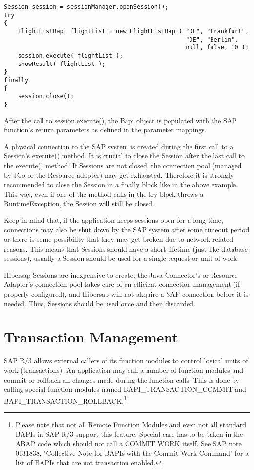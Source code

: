 \begin{lstlisting}[caption=Executing the BAPI function]
Session session = sessionManager.openSession();
try
{
    FlightListBapi flightList = new FlightListBapi( "DE", "Frankfurt", 
                                                    "DE", "Berlin", 
                                                    null, false, 10 );
    session.execute( flightList );
    showResult( flightList );
}
finally
{
    session.close();
}
\end{lstlisting}

After the call to session.execute(), the Bapi object is populated with the SAP function's return parameters as 
defined in the parameter mappings.

A physical connection to the SAP system is created during the first call to a Session's execute() method. 
It is crucial to close the Session after the last call to the execute() method. If Sessions are not
closed, the connection pool (managed by JCo or the Resource adapter) may get exhausted. 
Therefore it is strongly recommended to close the Session in a
finally block like in the above example. This way, even if one of the method calls in the try block throws
a RuntimeException, the Session will still be closed.
 
Keep in mind that, if the application keeps sessions open for a long time, connections may also be shut down 
by the SAP system after some timeout period or there is some possibility that they may get broken due to network related reasons. 
This means that Sessions should have a short lifetime (just like database sessions), usually a Session should 
be used for a single request or unit of work.  

Hibersap Sessions are inexpensive to create, the Java Connector's or Resource Adapter's connection pool takes care of 
an efficient connection management (if properly configured), and Hibersap will not akquire a 
SAP connection before it is needed. Thus, Sessions should be used once and then discarded.  

\section{Transaction Management} 

SAP R/3 allows external callers of its function modules to control logical units of work (transactions). 
An application may call a number of function modules and commit or rollback all changes made during
the function calls. This is done by calling special function modules named BAPI\_TRANSACTION\_COMMIT and 
BAPI\_TRANSACTION\_ROLLBACK.\footnote{Please note that not all Remote Function Modules and even not 
all standard BAPIs in SAP R/3 support this feature. Special care has to be taken in the ABAP code which should not
call a COMMIT WORK itself. See SAP note 0131838, "Collective Note for BAPIs with the Commit Work Command"
for a list of BAPIs that are not transaction enabled.}

